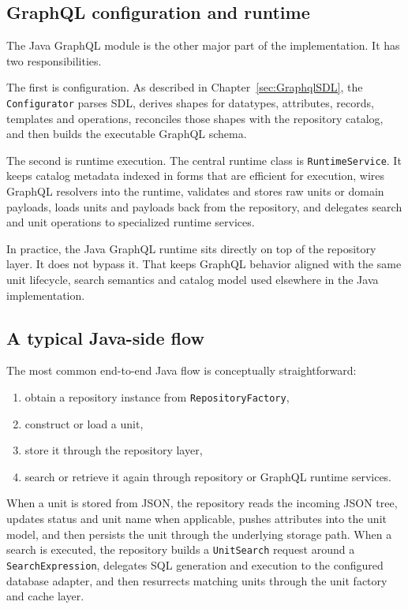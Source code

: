 \subsection{GraphQL configuration and runtime}

The Java GraphQL module is the other major part of the implementation. It has two responsibilities.

The first is configuration. As described in Chapter~\ref{sec:GraphqlSDL}, the \texttt{Configurator} parses SDL, derives shapes for datatypes, attributes, records, templates and operations, reconciles those shapes with the repository catalog, and then builds the executable GraphQL schema.

The second is runtime execution. The central runtime class is \texttt{RuntimeService}. It keeps catalog metadata indexed in forms that are efficient for execution, wires GraphQL resolvers into the runtime, validates and stores raw units or domain payloads, loads units and payloads back from the repository, and delegates search and unit operations to specialized runtime services.

In practice, the Java GraphQL runtime sits directly on top of the repository layer. It does not bypass it. That keeps GraphQL behavior aligned with the same unit lifecycle, search semantics and catalog model used elsewhere in the Java implementation.

\subsection{A typical Java-side flow}

The most common end-to-end Java flow is conceptually straightforward:
\begin{enumerate}
\item obtain a repository instance from \texttt{RepositoryFactory},
\item construct or load a unit,
\item store it through the repository layer,
\item search or retrieve it again through repository or GraphQL runtime services.
\end{enumerate}

When a unit is stored from JSON, the repository reads the incoming JSON tree, updates status and unit name when applicable, pushes attributes into the unit model, and then persists the unit through the underlying storage path. When a search is executed, the repository builds a \texttt{UnitSearch} request around a \texttt{SearchExpression}, delegates SQL generation and execution to the configured database adapter, and then resurrects matching units through the unit factory and cache layer.

